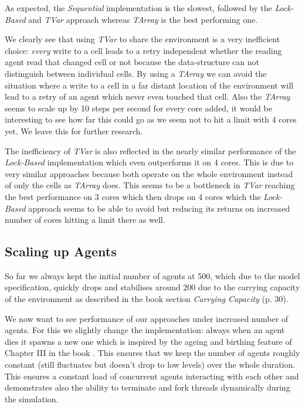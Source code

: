 As expected, the \textit{Sequential} implementation is the slowest, followed by the \textit{Lock-Based} and \textit{TVar} approach whereas \textit{TArray} is the best performing one.

We clearly see that using \textit{TVar} to share the environment is a very inefficient choice: \textit{every} write to a cell leads to a retry independent whether the reading agent read that changed cell or not because the data-structure can not distinguish between individual cells. By using a \textit{TArray} we can avoid the situation where a write to a cell in a far distant location of the environment will lead to a retry of an agent which never even touched that cell. Also the \textit{TArray} seems to scale up by 10 steps per second for every core added, it would be interesting to see how far this could go as we seem not to hit a limit with 4 cores yet. We leave this for further research.

The inefficiency of \textit{TVar} is also reflected in the nearly similar performance of the \textit{Lock-Based} implementation which even outperforms it on 4 cores. This is due to very similar approaches because both operate on the whole environment instead of only the cells as \textit{TArray} does. This seems to be a bottleneck in \textit{TVar} reaching the best performance on 3 cores which then drops on 4 cores which the \textit{Lock-Based} approach seems to be able to avoid but reducing its returns on increased number of cores hitting a limit there as well.

\subsection{Scaling up Agents}
So far we always kept the initial number of agents at 500, which due to the model specification, quickly drops and stabilises around 200 due to the carrying capacity of the environment as described in the book \cite{epstein_growing_1996} section \textit{Carrying Capacity} (p. 30).

We now want to see performance of our approaches under increased number of agents. For this we slightly change the implementation: always when an agent dies it spawns a new one which is inspired by the ageing and birthing feature of Chapter III in the book \cite{epstein_growing_1996}. This ensures that we keep the number of agents roughly constant (still fluctuates but doesn't drop to low levels) over the whole duration. This ensures a constant load of concurrent agents interacting with each other and demonstrates also the ability to terminate and fork threads dynamically during the simulation.

